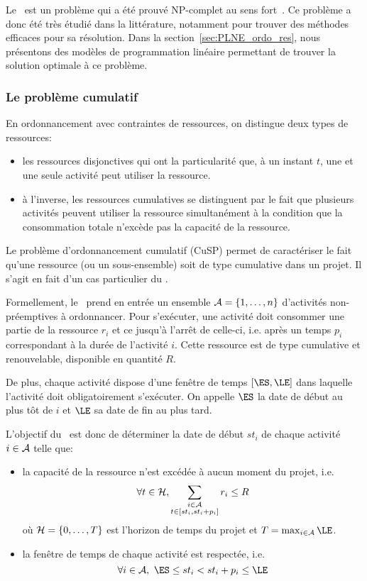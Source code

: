 Le \RCPSP~est un problème qui a été prouvé NP-complet au sens
fort~\cite{NP_RCPSP}. Ce problème a donc été très étudié dans la
littérature, notamment pour trouver des méthodes efficaces pour sa
résolution. Dans la section~\ref{sec:PLNE_ordo_res}, nous présentons des
modèles de programmation linéaire permettant de trouver la solution
optimale à ce problème. 

\subsubsection{Le problème cumulatif}

En ordonnancement avec contraintes de ressources, on distingue deux
types de ressources:
\begin{itemize}
\item les ressources disjonctives qui ont la particularité que, à un
  instant $t$, une et une seule activité peut utiliser la ressource.
\item à l'inverse, les ressources cumulatives se distinguent par le
  fait que plusieurs activités peuvent utiliser la ressource
  simultanément à la condition que la consommation totale n'excède pas
  la capacité de la ressource.
\end{itemize}
Le problème d'ordonnancement cumulatif (CuSP)\index{\CuSPidx} permet
de caractériser le fait qu'une ressource (ou un sous-ensemble) soit de
type cumulative dans un projet. Il s'agit en fait d'un cas particulier
du \RCPSP.

Formellement, le \CUSP~prend en entrée un ensemble $
{\cal A}=\{1,\dots,n\}$ d'activités non-préemptives à ordonnancer. Pour s'exécuter, une
activité doit consommer une partie de la ressource $r_i$ et ce jusqu'à
l'arrêt de celle-ci, i.e. après un temps $p_i$ correspondant à la
durée de l'activité $i$. Cette ressource est de type cumulative et
renouvelable, disponible en quantité $R$. 

De plus, chaque activité dispose d'une fenêtre de temps $[\ES,\LE]$
dans laquelle l'activité doit obligatoirement s'exécuter. On appelle $\ES$ 
la date de début au plus tôt de $i$ et $\LE$ sa date de
fin au plus tard. 

L'objectif du \CUSP~est donc de déterminer la date de début $st_i$ de
chaque activité $i \in {\cal A}$ telle que:
\begin{itemize}
\item la capacité de la ressource n'est excédée à aucun moment du
  projet, i.e.
  \begin{equation} \forall t \in {\cal H},\sum_{\substack{i\in {\cal A}\\ t \in
        [st_i,st_i+p_i]}} r_{i} \le  R\end{equation}
  où ${\cal H}=\{0,\dots,T\}$ est l'horizon de temps du projet et $T=\max_{i
    \in \A} \LE$.
\item la fenêtre de temps de chaque activité est respectée, i.e. 
  \begin{equation} \forall i \in \A,\ \ES \le st_i < st_i+p_i \le \LE \end{equation}
\end{itemize}

